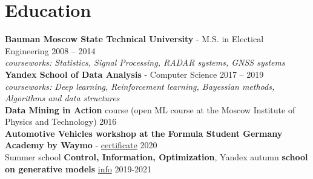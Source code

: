 \section*{\sectionformat Education}
\textbf{Bauman Moscow State Technical University} - M.S. in Electical Engineering \hfill 2008 -- 2014 \\
\textit{courseworks: Statistics, Signal Processing, RADAR systems, GNSS systems} \\
% 
\textbf{Yandex School of Data Analysis} - Computer Science \hfill 2017 -- 2019 \\
\textit{courseworks: Deep learning, Reinforcement learning, Bayessian methods, Algorithms and data structures} \\
% 
\textbf{Data Mining in Action} course (open ML course at the Moscow Institute of Physics and Technology) \hfill    2016         \\
% 
%
\textbf{Automotive Vehicles workshop at the Formula Student Germany Academy by Waymo} - \href{https://drive.google.com/file/d/1-WxECccxBrRWIvEt9WQeXKTueiF658r7/view?usp=sharing}{certificate}   \hfill  2020       \\
% 
Summer school \textbf{Control, Information, Optimization}, Yandex autumn \textbf{school on generative models} \href{https://indico.cern.ch/event/1082512/timetable/#20211123}{info}                  \hfill  2019-2021
\nolinebreak